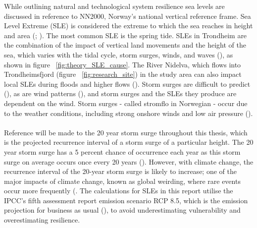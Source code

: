 While outlining natural and technological system resilience sea levels are discussed in reference to NN2000, Norway's national vertical reference frame. Sea Level Extreme (SLE) is considered the extreme to which the sea reaches in height and area (\cite{nilsen_sealevelchangefornorway_2015}; \cite{kartverket_se_2021}). The most common SLE is the spring tide. SLEs in Trondheim are the combination of the impact of vertical land movements and the height of the sea, which varies with the tidal cycle, storm surges, winds, and waves (\cite{hanssen-bauer_climate_2017}), as shown in figure ~\ref{fig:theory_SLE_cause}. The River Nidelva, which flows into Trondheimsfjord (figure ~\ref{fig:research_site}) in the study area can also impact local SLEs during floods and higher flows (\cite{statkraft_leirfossene_2022}). Storm surges are difficult to predict (\cite{nilsen_sealevelchangefornorway_2015}), as are wind patterns (\cite{rod_three_2015}), and storm surges and the SLEs they produce are dependent on the wind. Storm surges - called stromflo in Norwegian -  occur due to the weather conditions, including strong onshore winds and low air pressure (\cite{hanssen_saksframlegg_2013}). 

\paragraph{}

Reference will be made to the 20 year storm surge throughout this thesis, which is the projected recurrence interval of a storm surge of a particular height.  The 20 year storm surge has a 5 percent chance of occurrence each year as this storm surge on average occurs once every 20 years (\cite{hanssen_saksframlegg_2013}). However, with climate change, the recurrence interval of the 20-year storm surge is likely to increase; one of the major impacts of climate change, known as global weirding, where rare events occur more frequently (\cite{wilson_when_2019}. The calculations for SLEs in this report utilise the IPCC's fifth assessment report emission scenario RCP 8.5, which is the emission projection for business as usual (\cite{hanssen-bauer_climate_2017}), to avoid underestimating vulnerability and overestimating resilience.  
\paragraph{}



